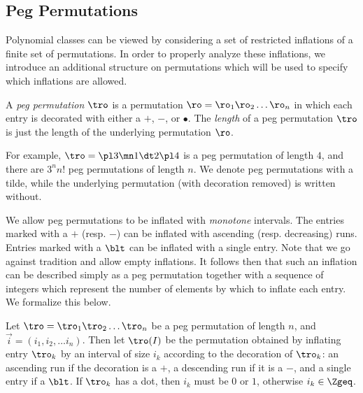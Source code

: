 \documentclass[12pt,twoside]{memoir}
\begin{document}
    \subsection{Peg Permutations}

      Polynomial classes can be viewed by considering a set of restricted
      inflations of a finite set of permutations. In order to properly analyze
      these inflations, we introduce an additional structure on permutations which
      will be used to specify which inflations are allowed. 

      \begin{definition} \label{polyclass:def:pegperm}
        A \emph{peg permutation} $\tro$ is a permutation $\ro = \ro_1 \ro_2 \dots
        \ro_n$ in which each entry is decorated with either a $+$, $-$, or
        $\bullet$. The \emph{length} of a peg permutation $\tro$ is just the
        length of the underlying permutation $\ro$. 
      \end{definition}
      
      For example, $ \tro = \pl3 \mn1 \dt2 \pl4$ is a peg permutation of length $4$,
      and there are $3^n n!$ peg permutations of length $n$. 
      We denote peg permutations with a tilde, while the underlying permutation
      (with decoration removed) is written without.

      We allow peg permutations to be inflated with \emph{monotone} intervals. The
      entries marked with a $+$ (resp. $-$) can be inflated with ascending (resp.
      decreasing) runs. Entries marked with a $\blt$ can be inflated with a single
      entry. Note that we go against tradition and allow empty inflations. It
      follows then that such an inflation can be described simply as a peg
      permutation together with a sequence of integers which represent the number of
      elements by which to inflate each entry. We formalize this below. 

      \begin{definition} \label{polyclass:def:inflation}
        Let $\tro = \tro_1 \tro_2 \dots \tro_n$ be a peg permutation of length
        $n$, and $\vec i = (i_1, i_2, \dots i_n)$. Then let $\tro(I)$ be the
        permutation obtained by inflating entry $\tro_k$ by an interval of size
        $i_k$ according to the decoration of $\tro_k$: an ascending run if the
        decoration is a $+$, a descending run if it is a $-$, and a single entry if
        a $\blt$. If $\tro_k$ has a dot, then $i_k$ must be $0$ or $1$, otherwise
        $i_k \in \Zgeq$. 
      \end{definition}
\end{document}
